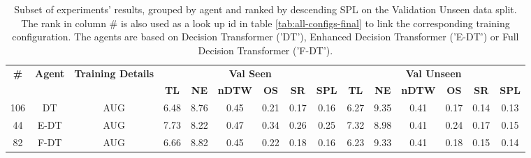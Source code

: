 \begin{table}
\centering
\caption{\label{tab:env_drop}Subset of experiments' results, grouped by agent and ranked by descending SPL on the Validation Unseen data split. The rank in column \# is also used as a look up id in table \ref{tab:all-configs-final} to link the corresponding training configuration.     \newline The agents are based on Decision Transformer ('DT'), Enhanced Decision Transformer ('E-DT') or Full Decision Transformer ('F-DT').}
\begin{tabular}{@{\hskip3pt}c@{\hskip3pt}c@{\hskip3pt}c@{\hskip3pt}c@{\hskip3pt}c@{\hskip3pt}c@{\hskip3pt}c@{\hskip3pt}c@{\hskip3pt}c@{\hskip3pt}c@{\hskip3pt}c@{\hskip3pt}c@{\hskip3pt}c@{\hskip3pt}c@{\hskip3pt}c}
\toprule
\textbf{\#} & \textbf{Agent} & \textbf{Training Details} & \multicolumn{6}{c}{\textbf{Val Seen}} & \multicolumn{6}{c}{\textbf{Val Unseen}} \\
 \textbf{~} &     \textbf{~} &                \textbf{~} &       \textbf{TL} & \textbf{NE} & \textbf{nDTW} & \textbf{OS} & \textbf{SR} & \textbf{SPL} &         \textbf{TL} & \textbf{NE} & \textbf{nDTW} & \textbf{OS} & \textbf{SR} & \textbf{SPL} \\
\midrule
        106 &             DT &                       AUG &              6.48 &        8.76 &          0.45 &        0.21 &        0.17 &         0.16 &                6.27 &        9.35 &          0.41 &        0.17 &        0.14 &         0.13 \\
         44 &           E-DT &                       AUG &              7.73 &        8.22 &          0.47 &        0.34 &        0.26 &         0.25 &                7.32 &        8.98 &          0.41 &        0.24 &        0.17 &         0.15 \\
         82 &           F-DT &                       AUG &              6.66 &        8.82 &          0.45 &        0.22 &        0.18 &         0.16 &                6.23 &        9.33 &          0.41 &        0.18 &        0.15 &         0.14 \\
\bottomrule
\end{tabular}
\end{table}
